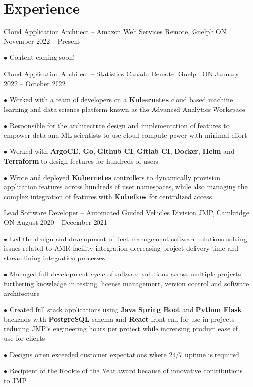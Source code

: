 \documentclass[a4paper,11pt]{article}
\newcommand{\sectionsep}{\vspace{-2.5mm}}
\begin{document}
\sectionsep
\section{Experience}
\resumeSubHeadingListStart

\resumeExp
{Cloud Application Architect -- Amazon Web Services}
{Remote, Guelph ON}
{November 2022 -- Present}
{}
\resumeItemListStart
\item[$\bullet$] Content coming soon!
\resumeItemListEnd

\resumeExp
{Cloud Application Architect -- Statistics Canada}
{Remote, Guelph ON}
{January 2022 -- October 2022}
{}
\resumeItemListStart
\item[$\bullet$] Worked with a team of developers on a \textbf{Kubernetes} cloud based machine learning and data science
platform known as the Advanced Analytics Workspace
\href{https://analytics-platform.statcan.gc.ca/covid19}{\footnotesize{\faExternalLink}}
\item[$\bullet$] Responsible for the architecture design and implementation of features to  empower data and ML scientists to
use cloud compute power with  minimal effort
\item[$\bullet$] Worked with \textbf{ArgoCD}, \textbf{Go}, \textbf{Github CI}, \textbf{Gitlab CI}, \textbf{Docker}, \textbf{Helm} and
\textbf{Terraform} to design features for hundreds of users
\item[$\bullet$] Wrote and deployed \textbf{Kubernetes} controllers to dynamically provision application
features across hundreds of user namespaces, while
also managing the complex integration of features with \textbf{Kubeflow} for centralized access
\resumeItemListEnd

\resumeExp
{Lead Software Developer -- Automated Guided Vehicles Division}
{JMP, Cambridge ON}
{August 2020 -- December 2021}
{}
\resumeItemListStart
\item[$\bullet$] Led the design and development of fleet management software solutions solving issues related to
AMR facility integration decreasing project delivery time and streamlining integration processes
\item[$\bullet$]  Managed full development cycle of software solutions across multiple projects, furthering
knowledge in testing, license management, version control and software architecture
\item[$\bullet$] Created full stack applications using \textbf{Java Spring Boot} and \textbf{Python Flask} backends with
\textbf{PostgreSQL} schema and \textbf{React} front-end for use in projects reducing JMP's engineering hours
per project while increasing product ease of use for clients
\item[$\bullet$] Designs often exceeded customer expectations where 24/7 uptime is required
\item[$\bullet$] Recipient of the Rookie of the Year award because of innovative contributions to JMP
\resumeItemListEnd
\end{document}
